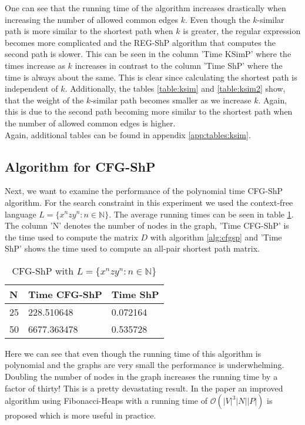 \documentclass[]{article}
\numberwithin{equation}{section}
\begin{document}
One can see that the running time of the algorithm increases drastically when increasing the number of allowed common edges $k$. Even though the $k$-similar path is more similar to the shortest path when $k$ is greater, the regular expression becomes more complicated and the REG-ShP algorithm that computes the second path is slower. This can be seen in the column 'Time KSimP' where the times increase as $k$ increases in contrast to the column 'Time ShP' where the time is always about the same. This is clear since calculating the shortest path is independent of $k$. Additionally, the tables \ref{table:ksim} and \ref{table:ksim2} show, that the weight of the $k$-similar path becomes smaller as we increase $k$. Again, this is due to the second path becoming more similar to the shortest path when the number of allowed common edges is higher.\\

Again, additional tables can be found in appendix \ref{app:tables:ksim}.

\subsection{Algorithm for CFG-ShP}
\label{sec:study:cfg}

Next, we want to examine the performance of the polynomial time CFG-ShP algorithm. For the search constraint in this experiment we used the context-free language $L = \{x^nzy^n:n\in\mathbb{N}\}$. The average running times can be seen in table \ref{table:cfg}. The column 'N' denotes the number of nodes in the graph, 'Time CFG-ShP' is the time used to compute the matrix $D$ with algorithm \ref{alg:cfgsp} and 'Time ShP' shows the time used to compute an all-pair shortest path matrix.

\begin{table}[H]
	\centering
	\setlength\tabcolsep{2pt}
	\begin{tabular}{|l|l|l|}
		\hline
		N  & Time CFG-ShP & Time ShP \\ \hline
		25 & 228.510648   & 0.072164 \\ \hline
		50 & 6677.363478  & 0.535728 \\ \hline
	\end{tabular}
	\caption{CFG-ShP with $L = \{x^nzy^n:n\in\mathbb{N}\}$}
	\label{table:cfg}
\end{table}

Here we can see that even though the running time of this algorithm is polynomial and the graphs are very small the performance is underwhelming. Doubling the number of nodes in the graph increases the running time by a factor of thirty! This is a pretty devastating result. In the paper \cite{WWB08} an improved algorithm using Fibonacci-Heaps with a running time of $\mathcal{O}(|V|^3|N||P|)$ is proposed which is more useful in practice.
\end{document}
